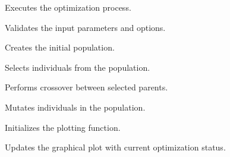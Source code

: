\documentclass[12pt,a4paper]{article}
\begin{document}
\noindent Executes the optimization process.

\vspace{5mm}
\noindent {}


\noindent Validates the input parameters and options.

\vspace{5mm}
\noindent {}


\noindent Creates the initial population.

\vspace{5mm}
\noindent {}


\noindent Selects individuals from the population.

\vspace{5mm}
\noindent {}


\noindent Performs crossover between selected parents.

\vspace{5mm}
\noindent {}


\noindent Mutates individuals in the population.

\vspace{5mm}
\noindent {}


\noindent Initializes the plotting function.

\vspace{5mm}
\noindent {}


\noindent Updates the graphical plot with current optimization status.
\end{document}
